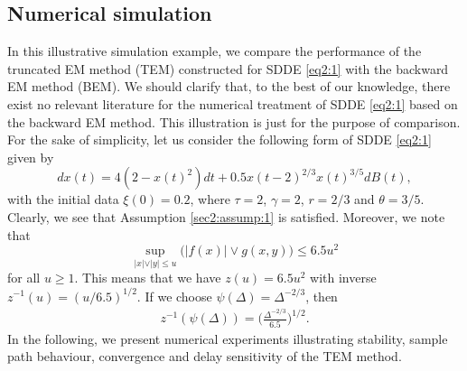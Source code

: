 \documentclass[11pt]{article}
\begin{document}
\subsection{Numerical simulation}
In this illustrative simulation example, we compare the performance of the truncated EM method (TEM) constructed for SDDE \eqref{eq2:1} with the backward EM method (BEM). We should clarify that, to the best of our knowledge, there exist no relevant literature for the numerical treatment of SDDE \eqref{eq2:1} based on the backward  EM method. This illustration is just for the purpose of comparison. For the sake of simplicity, let us consider the following form of SDDE \eqref{eq2:1} given by
\begin{equation}\label{eq:sm1}
 dx(t)=4(2-x(t)^2)dt+0.5x(t-2)^{2/3}x(t)^{3/5}dB(t),
\end{equation}
with the initial data $\xi(0)=0.2$, where  $\tau=2$, $\gamma=2$, $r=2/3$ and $\theta=3/5$. Clearly, we see that Assumption \ref{sec2:assump:1} is satisfied. Moreover, we note that
\begin{equation*}
\sup_{\vert x\vert\vee\vert y\vert \le u}\Big(|f(x)|\vee g(x,y)\Big)\le 6.5u^2
\end{equation*}
for all $u\ge 1$. This means that we have $z(u)=6.5u^2$ with inverse $z^{-1}(u)=(u/6.5)^{1/2}$. If we choose $\psi(\Delta)=\Delta^{-2/3}$, then 
\begin{align*}
z^{-1}(\psi(\Delta))=\Big(\frac{\Delta^{-2/3}}{6.5}\Big)^{1/2}.
\end{align*}  
In the following, we present numerical experiments illustrating stability, sample path behaviour, convergence and delay sensitivity of the TEM method.

\vspace{1em}
\end{document}
